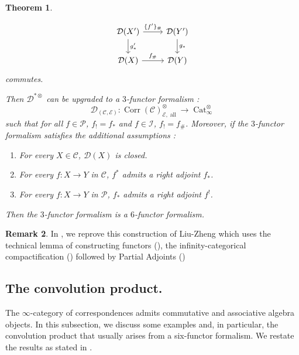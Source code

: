 \documentclass[14pt]{article}
\newtheorem{theorem}{Theorem}[subsection]
\theoremstyle{definition}
\newtheorem{remark}[theorem]{Remark}
\newcommand{\E}{\mathcal{E}}
\newcommand{\D}{\mathcal{D}}
\renewcommand{\P}{\mathcal{P}}
\newcommand{\op}[1]{\operatorname{#1}}
\newcommand{\I}{\mathscr{I}}
\newcommand{\Ca}{\mathcal{C}}
\numberwithin{subsection}{section}
\begin{document}
\begin{theorem}
\begin{enumerate}
			\begin{equation}\label{8.6}
				\begin{tikzcd}
					\D(X') \arrow[r,"\lbrace f' \rbrace_{\#}"] \arrow[d,"g'_*"] & \D(Y') \arrow[d,"g_*"] \\
					\D(X) \arrow[r,"f_{\#}"] & \D(Y) 
				\end{tikzcd}
			\end{equation}
			commutes.
			
		\end{enumerate}
    Then $\D^{*\otimes}$ can be upgraded to a $3$-functor formalism : 
    \begin{equation}
        \D_{(\Ca,\E)} : \op{Corr}(\Ca)_{\E,\op{all}}^{\otimes} \to \op{Cat}_{\infty}^{\otimes}   \end{equation}
        such that for all $f \in \P$, $f_!=f_*$ and $f\in \I$, $f_!=f_{\#}$.
Moreover, if the $3$-functor formalism satisfies the additional assumptions :
\begin{enumerate}
    \item For every $X \in \Ca$, $\D(X)$ is closed.
    \item For every $f: X \to Y$ in $\Ca$, $f^*$ admits a right adjoint $f_*$.
    \item For every $f: X \to Y$ in $\P$, $f_*$ admits a right adjoint $f^!$.
    \end{enumerate}
Then the $3$-functor formalism is a $6$-functor formalism.         
	\end{theorem}

\begin{remark}
    In \cite{chowdhury2025sixfunctorformalismsiiiconstruction}, we reprove this construction of Liu-Zheng which uses the technical lemma of constructing functors (\cite[Theorem 1.0.4]{chowdhury2023sixfunctorformalismsi}), the infinity-categorical compactification (\cite[Theorem 1.0.3]{chowdhury2025sixfunctorformalismsii}) followed by Partial Adjoints (\cite[Theorem 3.2.1]{chowdhury2025sixfunctorformalismsiiiconstruction})
\end{remark}

\subsection{The convolution product.}

The $\infty$-category of correspondences admits commutative and associative algebra objects. In this subsection, we discuss some examples and, in particular, the convolution product that usually arises from a six-functor formalism. We restate the results as stated in \cite[Remark 8.12]{zhu2025tamecategoricallocallanglands}.
\end{document}

